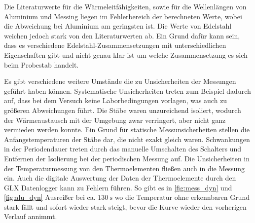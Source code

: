Die Literaturwerte für die Wärmeleitfähigkeiten, sowie für die Wellenlängen von Aluminium und Messing liegen im Fehlerbereich der berechneten Werte, wobei die Abweichung bei Aluminium am geringsten ist.
Die Werte von Edelstahl weichen jedoch stark von den Literaturwerten ab. Ein Grund dafür kann sein, dass es verschiedene Edelstahl-Zusammensetzungen mit unterschiedlichen
Eigenschaften gibt und nicht genau klar ist um welche Zusammensetzung es sich beim Probestab handelt.

Es gibt verschiedene weitere Umstände die zu Unsicherheiten der Messungen geführt haben können.
Systematische Unsicherheiten treten zum Beispiel dadurch auf, dass bei dem Versuch keine Laborbedingungen vorlagen, was auch zu größeren Abweichungen führt.
Die Stäbe waren unzureichend isoliert, wodurch der Wärmeaustausch mit der Umgebung zwar verringert, aber nicht ganz vermieden werden konnte.
Ein Grund für statische Messunsicherheiten stellen die Anfangstemperaturen der Stäbe dar, die nicht exakt gleich waren.
Schwankungen in der Periodendauer treten durch das manuelle Umschalten des Schalters und Entfernen der Isolierung bei der periodischen Messung auf.
Die Unsicherheiten in der Temperaturmessung von den Thermoelementen fließen auch in die Messung ein.
Auch die digitale Auswertung der Daten der Thermoelemente durch den GLX Datenlogger kann zu Fehlern führen.
So gibt es in \autoref{fig:mess_dyn} und \autoref{fig:alu_dyn} Ausreißer bei ca. $\qty{130}{\second}$ wo die Temperatur ohne erkennbaren Grund stark fällt und sofort wieder stark
steigt, bevor die Kurve wieder den vorherigen Verlauf annimmt.

 




